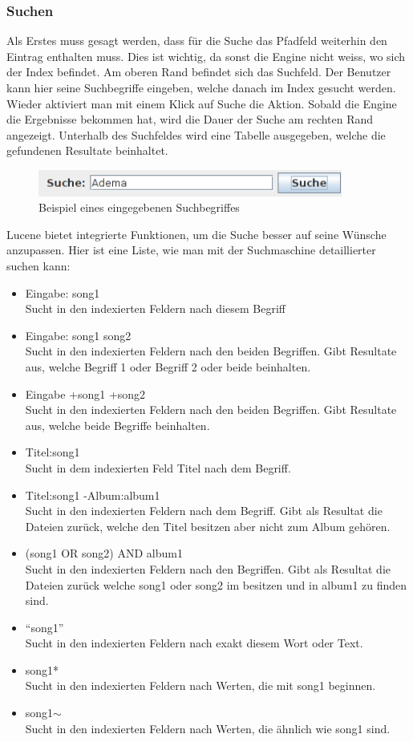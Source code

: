 \documentclass[12pt,a4paper,ngerman]{report}
\begin{document}
\subsubsection{Suchen}
Als Erstes muss gesagt werden, dass für die Suche das Pfadfeld weiterhin den Eintrag enthalten muss. Dies ist wichtig, da sonst die Engine nicht weiss, wo sich der Index befindet. Am oberen Rand befindet sich das Suchfeld. Der Benutzer kann hier seine Suchbegriffe eingeben, welche danach im Index gesucht werden. Wieder aktiviert man mit einem Klick auf Suche die Aktion. Sobald die Engine die Ergebnisse bekommen hat, wird die Dauer der Suche am rechten Rand angezeigt. Unterhalb des Suchfeldes wird eine Tabelle ausgegeben, welche die gefundenen Resultate beinhaltet.
\begin{figure}[h!]
\centering
\includegraphics[width=10cm]{img/suche.png}
\caption{Beispiel eines eingegebenen Suchbegriffes\protect\footnotemark}
\end{figure}
Lucene bietet integrierte Funktionen, um die Suche besser auf seine Wünsche anzupassen. Hier ist eine Liste, wie man mit der Suchmaschine detaillierter suchen kann:
\begin{itemize}
	\item Eingabe: song1\\Sucht in den indexierten Feldern nach diesem Begriff
	\item Eingabe: song1 song2\\Sucht in den indexierten Feldern nach den beiden Begriffen. Gibt Resultate aus, welche Begriff 1 oder Begriff 2 oder beide beinhalten.
	\item Eingabe +song1 +song2\\Sucht in den indexierten Feldern nach den beiden Begriffen. Gibt Resultate aus, welche beide Begriffe beinhalten.
	\item Titel:song1\\Sucht in dem indexierten Feld Titel nach dem Begriff.
	\item Titel:song1 -Album:album1\\Sucht in den indexierten Feldern nach dem Begriff. Gibt als Resultat die Dateien zurück, welche den Titel besitzen aber nicht zum Album gehören.
	\item (song1 OR song2) AND album1\\Sucht in den indexierten Feldern nach den Begriffen. Gibt als Resultat die Dateien zurück welche song1 oder song2 im besitzen und in album1 zu finden sind.
	\item \textquotedblleft song1\textquotedblright \\Sucht in den indexierten Feldern nach exakt diesem Wort oder Text.
	\item song1*\\Sucht in den indexierten Feldern nach Werten, die mit song1 beginnen.
	\item song1$\sim$\\Sucht in den indexierten Feldern nach Werten, die ähnlich wie song1 sind.
\end{itemize}
\end{document}
